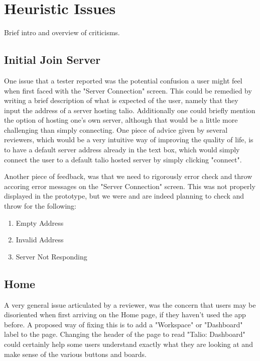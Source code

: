 \section{Heuristic Issues}

Brief intro and overview of criticisms.

\subsection{Initial Join Server}

    One issue that a tester reported was the potential confusion a user might feel when first faced with the "Server Connection" screen. This could be remedied by writing a brief description of what is expected of the user, namely that they input the address of a server hosting talio. Additionally one could briefly mention the option of hosting one's own server, although that would be a little more challenging than simply connecting. One piece of advice given by several reviewers, which would be a very intuitive way of improving the quality of life, is to have a default server address already in the text box, which would simply connect the user to a default talio hosted server by simply clicking "connect".

    Another piece of feedback, was that we need to rigorously error check and throw accoring error messages on the "Server Connection" screen. This was not properly displayed in the prototype, but we were and are indeed planning to check and throw for the following:
\begin{enumerate}
    \item Empty Address
    \item Invalid Address
    \item Server Not Responding
\end{enumerate}

\subsection{Home}

    A very general issue articulated by a reviewer, was the concern that users may be disoriented when first arriving on the Home page, if they haven't used the app before. A proposed way of fixing this is to add a "Workspace" or "Dashboard" label to the page. Changing the header of the page to read "Talio: Dashboard" could certainly help some users understand exactly what they are looking at and make sense of the various buttons and boards.

